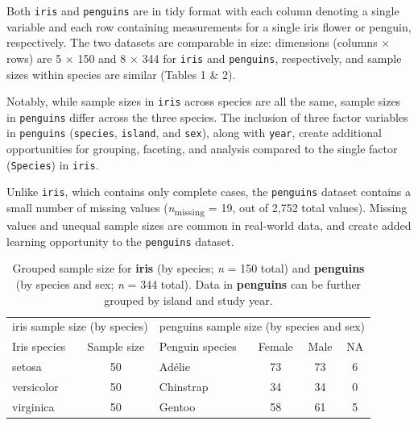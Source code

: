 Both \texttt{iris} and \texttt{penguins} are in tidy format
\citep{wickham_tidy_2014} with each column denoting a single variable
and each row containing measurements for a single iris flower or
penguin, respectively. The two datasets are comparable in size:
dimensions (columns × rows) are 5 × 150 and 8 × 344 for \texttt{iris}
and \texttt{penguins}, respectively, and sample sizes within species are
similar (Tables 1 \& 2).

Notably, while sample sizes in \texttt{iris} across species are all the
same, sample sizes in \texttt{penguins} differ across the three species.
The inclusion of three factor variables in \texttt{penguins}
(\texttt{species}, \texttt{island}, and \texttt{sex}), along with
\texttt{year}, create additional opportunities for grouping, faceting,
and analysis compared to the single factor (\texttt{Species}) in
\texttt{iris}.

Unlike \texttt{iris}, which contains only complete cases, the
\texttt{penguins} dataset contains a small number of missing values
(\emph{n}\textsubscript{missing} = 19, out of 2,752 total values).
Missing values and unequal sample sizes are common in real-world data,
and create added learning opportunity to the \texttt{penguins} dataset.

\begin{Schunk}
\begin{table}

\caption{\label{tab:counts-tbl-pdf}Grouped sample size for \textbf{iris} (by species; \textit{n} = 150 total) and \textbf{penguins} (by species and sex; \textit{n} = 344 total). Data in \textbf{penguins} can be further grouped by island and study year.}
\centering
\begin{tabular}[t]{lclccc}
\toprule
\multicolumn{2}{c}{iris sample size (by species)} & \multicolumn{4}{c}{penguins sample size (by species and sex)} \\
\cmidrule(l{3pt}r{3pt}){1-2} \cmidrule(l{3pt}r{3pt}){3-6}
Iris species & Sample size & Penguin species & Female & Male & NA\\
\midrule
setosa & 50 & Adélie & 73 & 73 & 6\\
versicolor & 50 & Chinstrap & 34 & 34 & 0\\
virginica & 50 & Gentoo & 58 & 61 & 5\\
\bottomrule
\end{tabular}
\end{table}

\end{Schunk}

